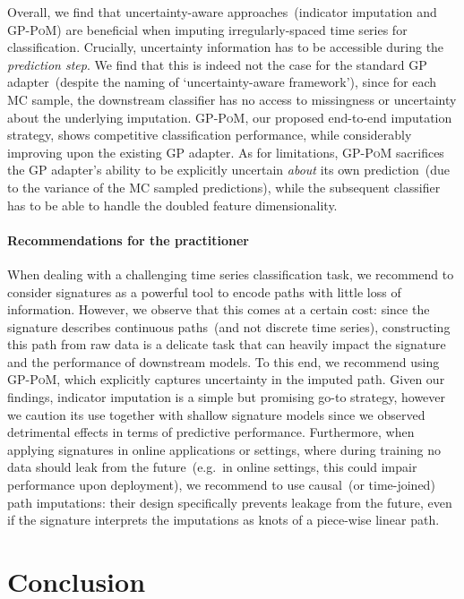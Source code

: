 \documentclass{article}
\begin{document}
Overall, we find that uncertainty-aware approaches~(indicator
imputation and \textsc{GP-PoM}) are beneficial when imputing
irregularly-spaced time series for classification.
%
Crucially, uncertainty information has to be accessible during the
\emph{prediction step}. We find that this is indeed not the case for
the standard GP adapter~(despite the naming of `uncertainty-aware
framework'), since for each MC sample, the downstream classifier has no access
to missingness or uncertainty about the underlying imputation.
\textsc{GP-PoM}, our proposed end-to-end imputation strategy, shows
competitive classification performance, while considerably improving
upon the existing GP adapter. As for
limitations, \textsc{GP-PoM} sacrifices the GP adapter's ability to be
explicitly uncertain \emph{about} its own prediction~(due to the
variance of the MC sampled predictions), while the subsequent classifier
has to be able to handle the doubled feature dimensionality.

\paragraph{Recommendations for the practitioner}
%
When dealing with a challenging time series classification task, we recommend to consider signatures as a powerful tool to encode paths with little loss of information. However, we observe that this comes at a certain cost: since the signature describes continuous paths~(and not discrete time series), constructing this path from raw data is a delicate task that can heavily impact the signature and the performance of downstream models. To this end, we recommend using \textsc{GP-PoM}, which explicitly captures uncertainty in the imputed path. Given our findings, indicator imputation is a simple but promising go-to strategy, however we caution its use together with shallow signature models since we observed detrimental effects in terms of predictive performance.
%
Furthermore, when applying signatures in online applications or settings, where during training no data should leak from the future~(e.g.\ in online settings, this could impair performance upon deployment), we recommend to use causal~(or time-joined) path imputations: their design specifically prevents leakage from the future, even if the signature interprets the imputations as knots of a piece-wise linear path. 

\section{Conclusion}
\end{document}
